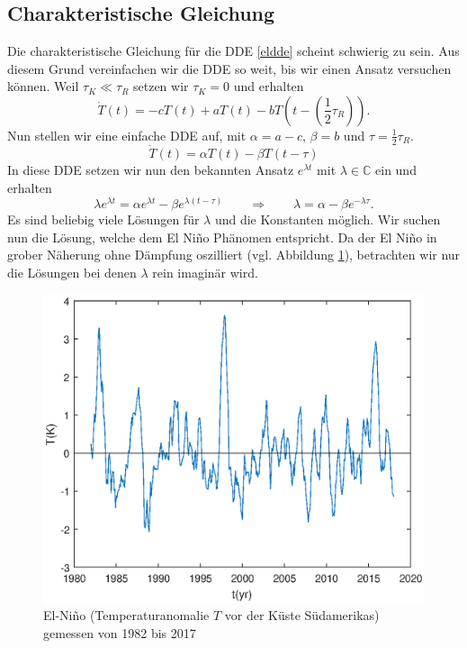 \subsection{Charakteristische Gleichung}
Die charakteristische Gleichung für die DDE \eqref{eldde} scheint schwierig zu sein. 
Aus diesem Grund vereinfachen wir die DDE so weit, bis wir einen Ansatz versuchen können.
Weil $\tau_K \ll \tau_R$ setzen wir $\tau_K = 0$ und erhalten
\begin{equation}
	\dot{T}(t)=-cT(t)+aT(t)-bT(t-(\frac{1}{2}\tau_R)).
\end{equation}
Nun stellen wir eine einfache DDE auf, mit $\alpha = a-c$, $\beta = b$ und $\tau = \frac{1}{2}\tau_R$.
\begin{equation}
	\dot{T}(t)=\alpha T(t)-\beta T(t-\tau)
\end{equation}
In diese DDE setzen wir nun den bekannten Ansatz $e^{\lambda t}$ mit $\lambda \in \mathbb{C}$ ein und erhalten
\begin{equation} \label{char_eldde}
	\lambda e^{\lambda t} = \alpha e^{\lambda t} - \beta e^{\lambda(t-\tau)} \qquad\Rightarrow\qquad \lambda = \alpha-\beta e^{-\lambda \tau}.
\end{equation}
Es sind beliebig viele Lösungen für $\lambda$ und die Konstanten möglich.
Wir suchen nun die Lösung, welche dem El Niño Phänomen entspricht.
Da der El Niño in grober Näherung ohne Dämpfung oszilliert (vgl. Abbildung \ref{fig:elnino}), betrachten wir nur die Lösungen bei denen $\lambda$ rein imaginär wird.
\begin{figure}
	\centering
	\includegraphics{verzoegert/inp/figures/elnino.eps}
	\caption{El-Niño (Temperaturanomalie $T$ vor der Küste Südamerikas) gemessen von 1982 bis 2017}
	\label{fig:elnino}
\end{figure}
